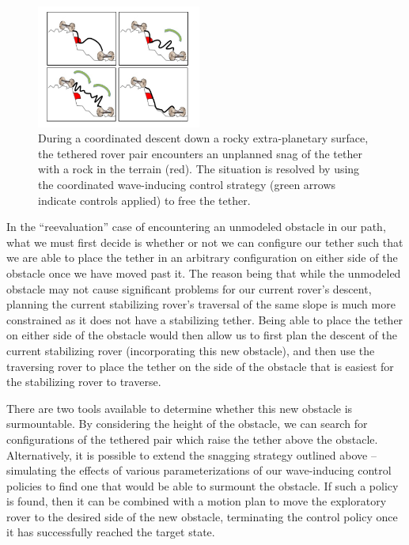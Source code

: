 \documentclass[12pt]{article}
\begin{document}
\begin{figure}
  \begin{center}
    \vspace{-0.3in}
    \includegraphics[width=0.48\textwidth, right]{tether_desnag.jpg}
  \end{center}
  \vspace{-0.4in}
  \caption{During a coordinated descent down a rocky extra-planetary
    surface, the tethered rover pair encounters an unplanned snag of
    the tether with a rock in the terrain (red). The situation is
    resolved by using the coordinated wave-inducing control strategy
    (green arrows indicate controls applied) to free the tether.}
  \label{fig:tethersnag}
\end{figure}

In the ``reevaluation'' case of encountering an unmodeled obstacle in our
path, what we must first decide is whether or not we can configure our
tether such that we are able to place the tether in an arbitrary
configuration on either side of the obstacle once we have moved past
it. The reason being that
while the unmodeled obstacle may not cause significant problems for
our current rover's descent, planning the current stabilizing rover's
traversal of the same slope is much more constrained as it does not
have a stabilizing tether. Being able to place the tether on either
side of the obstacle would then allow us to first plan the descent of
the current stabilizing rover (incorporating this new obstacle), and
then use the traversing rover to place the tether on the side of the
obstacle that is easiest for the stabilizing rover to traverse.

There are two tools available to determine whether this new obstacle
is surmountable. By considering the height of the obstacle, we can
search for configurations of the tethered pair which raise the tether
above the obstacle.  Alternatively, it is possible to extend the
snagging strategy outlined above -- simulating the effects of various
parameterizations of our wave-inducing control policies to find one
that would be able to surmount the obstacle. If such a policy is
found, then it can be combined with a motion plan to move the
exploratory rover to the desired side of the new obstacle, terminating
the control policy once it has successfully reached the target state.
\end{document}
